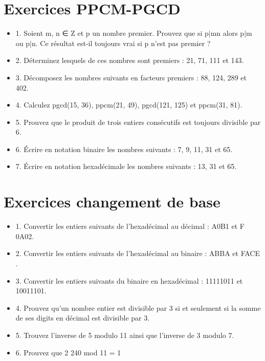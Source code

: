 \vspace{3mm} %
\section{Exercices PPCM-PGCD}
\vspace{3mm} %

\begin{itemize}

\item {1. Soient m, n ∈ Z et p un nombre premier. Prouvez que si p$|$mn alors p$|$m ou p$|$n. Ce résultat est-il toujours vrai si p n’est pas premier ? }

\item {2. Déterminez lesquels de ces nombres sont premiers : 21, 71, 111 et 143.}

\item {3. Décomposez les nombres suivants en facteurs premiers : 88, 124, 289 et 402.}

\item {4. Calculez pgcd(15, 36), ppcm(21, 49), pgcd(121, 125) et ppcm(31, 81).}

\item{5. Prouvez que le produit de trois entiers consécutifs est toujours divisible par 6.}

\item {6. Écrire en notation binaire les nombres suivants : 7, 9, 11, 31 et 65.}

\item {7. Écrire en notation hexadécimale les nombres suivants : 13, 31 et 65.}

\end{itemize}


\vspace{3mm} %
\section{Exercices changement de base}
\vspace{3mm} %

\begin{itemize}

\item {1. Convertir les entiers suivants de l’hexadécimal au décimal : A0B1 et F 0A02. }

\item {2. Convertir les entiers suivants de l’hexadécimal au binaire : ABBA et FACE .}

\item {3. Convertir les entiers suivants du binaire en hexadécimal : 11111011 et 10011101.}

\item {4. Prouvez qu’un nombre entier est divisible par 3 si et seulement si la somme de ses digits en décimal est divisible par 3.}

\item {5. Trouvez l’inverse de 5 modulo 11 ainsi que l’inverse de 3 modulo 7.}

\item {6. Prouvez que 2 240 mod 11 = 1}

\end{itemize}

